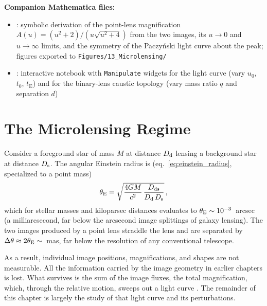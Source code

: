 \medskip
\noindent
\textbf{Companion Mathematica files:}
\begin{itemize}[nosep]
    \item {}:
          symbolic derivation of the point-lens magnification
          $A(u) = (u^2+2)/(u\sqrt{u^2+4})$ from the two images, its
          $u\to0$ and $u\to\infty$ limits, and the symmetry of the
          Paczy\'nski light curve about the peak; figures exported to
          \texttt{Figures/13\_Microlensing/}
    \item {}:
          interactive notebook with \texttt{Manipulate} widgets for the
          light curve (vary $u_0$, $t_0$, $t_{\mathrm{E}}$) and for the
          binary-lens caustic topology (vary mass ratio $q$ and separation
          $d$)
\end{itemize}


\section{The Microlensing Regime}
\label{sec:micro_intro}

Consider a foreground star of mass $M$ at distance $D_{\mathrm{d}}$ lensing a background
star at distance $D_{\mathrm{s}}$.  The angular Einstein radius is
(eq.~\ref{eq:einstein_radius}, specialized to a point mass)
\begin{equation}
    \theta_{\mathrm{E}} = \sqrt{\frac{4G M}{c^2}\,
    \frac{D_{\mathrm{ds}}}{D_{\mathrm{d}}\,D_{\mathrm{s}}}} \,,
    \label{eq:micro_thetaE}
\end{equation}
which for stellar masses and kiloparsec distances evaluates to
$\theta_{\mathrm{E}} \sim 10^{-3}$~arcsec (a milliarcsecond, far below the arcsecond
image splittings of galaxy lensing).  The two images produced by a point lens straddle the lens and are
separated by $\Delta\theta \approx 2\theta_{\mathrm{E}} \sim$~mas, far below the
resolution of any conventional telescope.

As a result, individual image positions,
magnifications, and shapes are not measurable.  All the information carried by
the image geometry in earlier chapters is lost.  What survives is the
sum of the image fluxes, the total magnification, which, through the
relative motion, sweeps out a light curve
\citep[Sect.~1]{schneider_kochanek_wambsganss_2006}.  The remainder of this
chapter is largely the study of that light curve and its perturbations.

